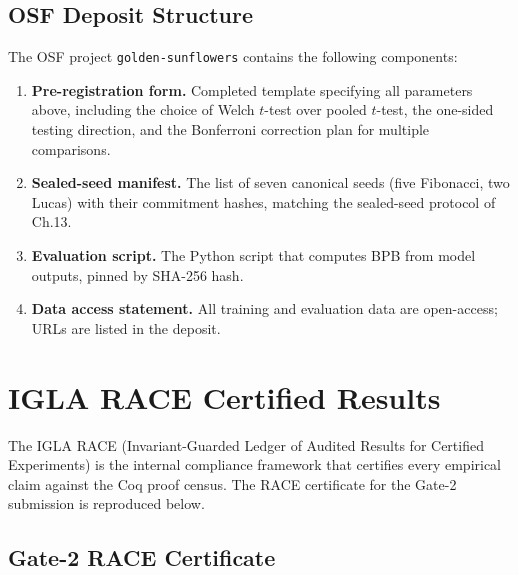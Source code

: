 \subsection{OSF Deposit
Structure}\label{app_e:osf-deposit}

The OSF project \texttt{golden-sunflowers} contains
the following components:

\begin{enumerate}
\item \textbf{Pre-registration form.} Completed
template specifying all parameters above, including
the choice of Welch \(t\)-test over pooled
\(t\)-test, the one-sided testing direction, and
the Bonferroni correction plan for multiple
comparisons.
\item \textbf{Sealed-seed manifest.} The list of
seven canonical seeds (five Fibonacci, two Lucas)
with their commitment hashes, matching the sealed-seed
protocol of Ch.13.
\item \textbf{Evaluation script.} The Python script
that computes BPB from model outputs, pinned by SHA-256
hash.
\item \textbf{Data access statement.} All training
and evaluation data are open-access; URLs are listed
in the deposit.
\end{enumerate}

\section{IGLA RACE Certified
Results}\label{app_e:igla-race-results}

The IGLA RACE (Invariant-Guarded Ledger of Audited
Results for Certified Experiments) is the internal
compliance framework that certifies every empirical
claim against the Coq proof census. The RACE
certificate for the Gate-2 submission is reproduced
below.

\subsection{Gate-2 RACE
Certificate}\label{app_e:gate2-race-certificate}

